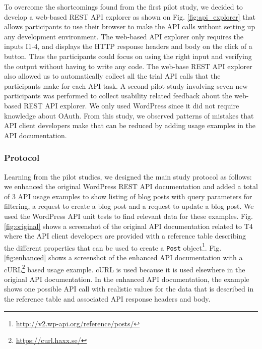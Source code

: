 \documentclass[conference]{IEEEtran}
\begin{document}
To overcome the shortcomings found from the first pilot study, we decided to develop a web-based REST API explorer as shown on Fig. \ref{fig:api_explorer} that allows participants to use their browser to make the API calls without setting up any development environment. The web-based API explorer only requires the inputs I1-4, and displays the HTTP response headers and body on the click of a button. Thus the participants could focus on using the right input and verifying the output without having to write any code. The web-base REST API explorer also allowed us to automatically collect all the trial API calls that the participants make for each API task. A second pilot study involving seven new participants was performed to collect usability related feedback about the web-based REST API explorer. We only used WordPress since it did not require knowledge about OAuth. From this study, we observed patterns of mistakes that API client developers make that can be reduced by adding usage examples in the API documentation.

\subsubsection{Protocol}
\label{sub:protocol}
Learning from the pilot studies, we designed the main study protocol as follows: we enhanced the original WordPress REST API documentation and added a total of 3 API usage examples to show listing of blog posts with query parameters for filtering, a request to create a blog post and a request to update a blog post. We used the WordPress API unit tests to find relevant data for these examples. Fig. \ref{fig:original} shows a screenshot of the original API documentation related to T4 where the API client developers are provided with a reference table describing the different properties that can be used to create a \lstinline{Post} object\footnote{\url{http://v2.wp-api.org/reference/posts/}}. Fig. \ref{fig:enhanced} shows a screenshot of the enhanced API documentation with a cURL\footnote{\url{https://curl.haxx.se/}} based usage example. cURL is used because it is used elsewhere in the original API documentation. In the enhanced API documentation, the example shows one possible API call with realistic values for the data that is described in the reference table and associated API response headers and body.
\end{document}
